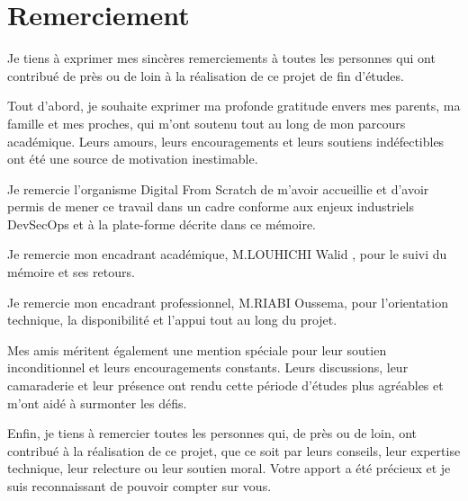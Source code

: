\documentclass[a4paper,12pt]{report}
\newcommand{\hostorg}{Digital From Scratch}
\newcommand{\academicsupervisor}{M.LOUHICHI  Walid }
\newcommand{\professionalsupervisor}{M.RIABI Oussema}
\begin{document}
\newpage
\chapter*{Remerciement}

\vspace{1cm}

Je tiens à exprimer mes sincères remerciements à toutes les personnes qui ont contribué de près ou de loin à la réalisation de ce projet de fin d’études.

\vspace{0.8cm}

Tout d’abord, je souhaite exprimer ma profonde gratitude envers mes parents, ma famille et mes proches, qui m’ont soutenu tout au long de mon parcours académique. Leurs amours, leurs encouragements et leurs soutiens indéfectibles ont été une source de motivation inestimable.

\vspace{0.8cm}

Je remercie l’organisme \hostorg{} de m’avoir accueillie et d’avoir permis de mener ce travail dans un cadre conforme aux enjeux industriels DevSecOps et à la plate-forme décrite dans ce mémoire.

\vspace{0.8cm}

Je remercie mon encadrant académique, \academicsupervisor{}, pour le suivi du mémoire et ses retours.

\vspace{0.8cm}

Je remercie mon encadrant professionnel, \professionalsupervisor{}, pour l’orientation technique, la disponibilité et l’appui tout au long du projet.

\vspace{0.8cm}

Mes amis méritent également une mention spéciale pour leur soutien inconditionnel et leurs encouragements constants. Leurs discussions, leur camaraderie et leur présence ont rendu cette période d’études plus agréables et m’ont aidé à surmonter les défis.

\vspace{0.8cm}

Enfin, je tiens à remercier toutes les personnes qui, de près ou de loin, ont contribué à la réalisation de ce projet, que ce soit par leurs conseils, leur expertise technique, leur relecture ou leur soutien moral. Votre apport a été précieux et je suis reconnaissant de pouvoir compter sur vous.
\end{document}

